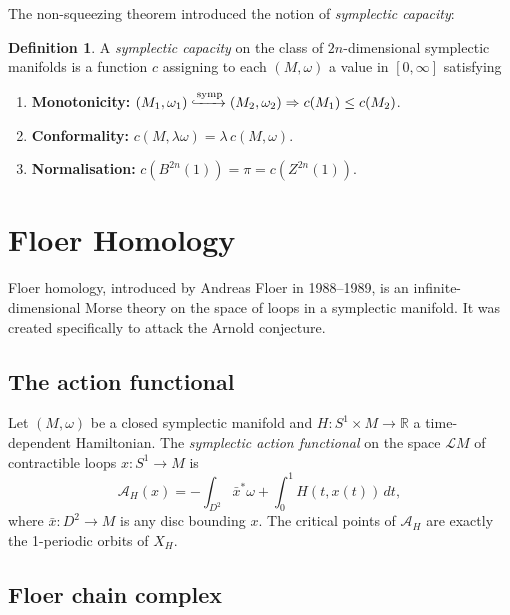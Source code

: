 \documentclass[12pt,a4paper]{amsart}
\theoremstyle{definition}
\newtheorem{definition}[theorem]{Definition}
\begin{document}
The non-squeezing theorem introduced the notion of \emph{symplectic capacity}:

\begin{definition}
A \emph{symplectic capacity} on the class of $2n$-dimensional symplectic
manifolds is a function $c$ assigning to each $(M, \omega)$ a value in
$[0, \infty]$ satisfying
\begin{enumerate}[label=(\roman*)]
  \item \textbf{Monotonicity:} $(M_1, \omega_1) \xhookrightarrow{\text{symp}}
    (M_2, \omega_2) \Rightarrow c(M_1) \leq c(M_2)$.
  \item \textbf{Conformality:} $c(M, \lambda\omega) = \lambda\, c(M,\omega)$.
  \item \textbf{Normalisation:} $c(B^{2n}(1)) = \pi = c(Z^{2n}(1))$.
\end{enumerate}
\end{definition}

\section{Floer Homology}
\label{sec:floer}

Floer homology, introduced by Andreas Floer in 1988--1989, is an
infinite-dimensional Morse theory on the space of loops in a symplectic
manifold.  It was created specifically to attack the Arnold conjecture.

\subsection{The action functional}

Let $(M, \omega)$ be a closed symplectic manifold and $H: S^1 \times M \to
\mathbb{R}$ a time-dependent Hamiltonian.  The \emph{symplectic action
functional} on the space $\mathcal{L}M$ of contractible loops $x: S^1 \to M$
is
\begin{equation}\label{eq:action}
  \mathcal{A}_H(x) = -\int_{D^2} \bar{x}^*\omega + \int_0^1 H(t, x(t))\,dt,
\end{equation}
where $\bar{x}: D^2 \to M$ is any disc bounding $x$.  The critical points
of $\mathcal{A}_H$ are exactly the 1-periodic orbits of $X_H$.

\subsection{Floer chain complex}
\end{document}
